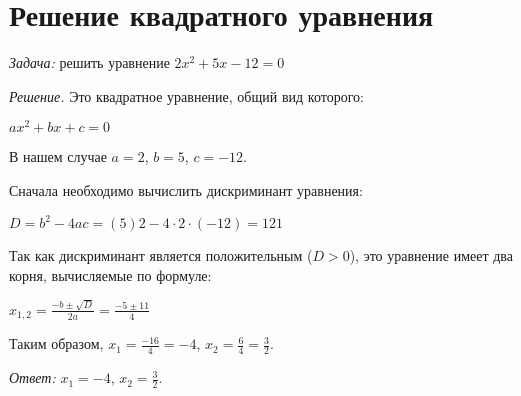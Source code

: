 \documentclass{article}
\begin{document}
\section{Решение квадратного уравнения}

\textit{Задача:} решить уравнение $2x^2+5x-12=0$

\hspace*{5mm}\textit{Решение.} Это квадратное уравнение, общий вид которого:

\hspace*{30mm}$ax^2+bx+c=0$

В нашем случае $a=2$, $b=5$, $c=-12$.

\hspace*{5mm}Сначала необходимо вычислить дискриминант уравнения:

\hspace*{30mm}$D=b^2-4ac=(5)2-4\cdot2\cdot(-12)=121$

Так как дискриминант является положительным ($D>0$), это уравнение
имеет два корня, вычисляемые по формуле:


\hspace*{30mm}$x_{1,2}=\frac{-b\pm\sqrt{D}}{2a}=\frac{-5\pm11}{4}$


Таким образом, $x_{1}=\frac{-16}{4}=-4$, $x_{2}=\frac{6}{4}=\frac{3}{2}$.


\hspace*{5mm}\textit{Ответ:} $x_{1}=-4$, $x_{2}=\frac{3}{2}$.
\end{document}
